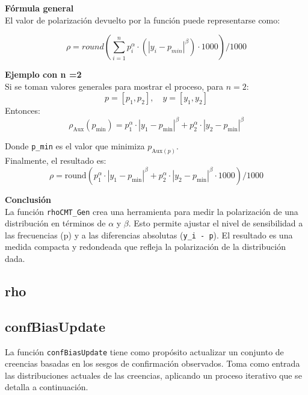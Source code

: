 \documentclass{article}
\begin{document}
	\textbf{Fórmula general}\\
	El valor de polarización devuelto por la función puede representarse como:
	
	\[
	\rho = round (\sum_{i=1}^n p_i^\alpha \cdot ( |y_i - p_{min}|^\beta) \cdot 1000) /1000
	\]  

	\textbf{Ejemplo con n =2}\\
	
	Si se toman valores generales para mostrar el proceso, para $n = 2$:  
	\[
	p = [p_1, p_2], \quad y = [y_1, y_2]
	\]  
	Entonces:  
	\[
	\rho_{\text{Aux}}(p_{\text{min}}) = p_1^\alpha \cdot |y_1 - p_{\text{min}}|^\beta + p_2^\alpha \cdot |y_2 - p_{\text{min}}|^\beta
	\]  
	
	Donde \texttt{p\_min} es el valor que minimiza $p_{\text{Aux}(p)}$. \\
	Finalmente, el resultado es:
	\[
	\rho = \text{round}\left(p_1^\alpha \cdot |y_1 - p_{\text{min}}|^\beta + p_2^\alpha \cdot |y_2 - p_{\text{min}}|^\beta \cdot 1000\right) / 1000
	\]  
	
	\textbf{Conclusión}\\

	La función \texttt{rhoCMT\_Gen} crea una herramienta para medir la polarización de una distribución en términos de $\alpha$ y $\beta$. Esto permite ajustar el nivel de sensibilidad a las frecuencias (p) y a las diferencias absolutas (\texttt{y\_i - p}). El resultado es una medida compacta y redondeada que refleja la polarización de la distribución dada.


    \subsection{rho}

\subsection{confBiasUpdate}
	
	La función \texttt{confBiasUpdate} tiene como propósito actualizar un conjunto de creencias basadas en los sesgos de confirmación observados. Toma como entrada las distribuciones actuales de las creencias, aplicando un proceso iterativo que se detalla a continuación.\\
	
\end{document}
